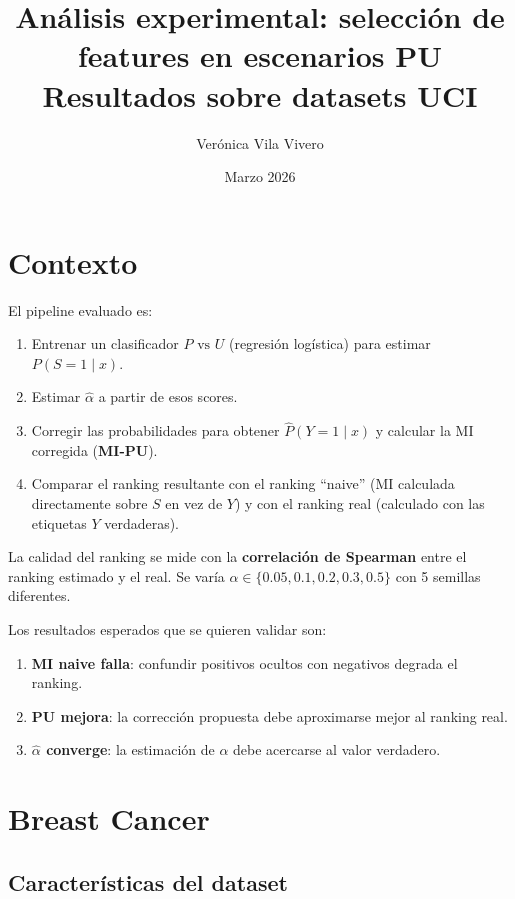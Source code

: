 \documentclass[a4paper,11pt]{article}
\title{\textbf{Análisis experimental: selección de features en escenarios PU}\\
\large Resultados sobre datasets UCI}
\author{Verónica Vila Vivero}
\date{Marzo 2026}
\begin{document}
\maketitle
\tableofcontents
\newpage

\section{Contexto}

El pipeline evaluado es:
\begin{enumerate}
    \item Entrenar un clasificador $P \text{ vs } U$ (regresión logística) para estimar $P(S=1 \mid x)$.
    \item Estimar $\hat{\alpha}$ a partir de esos scores.
    \item Corregir las probabilidades para obtener $\hat{P}(Y=1 \mid x)$ y calcular la MI corregida (\textbf{MI-PU}).
    \item Comparar el ranking resultante con el ranking ``naive'' (MI calculada directamente sobre $S$ en vez de $Y$) y con el ranking real (calculado con las etiquetas $Y$ verdaderas).
\end{enumerate}

La calidad del ranking se mide con la \textbf{correlación de Spearman} entre el ranking estimado y el real. Se varía $\alpha \in \{0.05, 0.1, 0.2, 0.3, 0.5\}$ con 5 semillas diferentes.

\medskip
Los resultados esperados que se quieren validar son:
\begin{enumerate}
    \item[\textbf{H1}] \textbf{MI naive falla}: confundir positivos ocultos con negativos degrada el ranking.
    \item[\textbf{H2}] \textbf{PU mejora}: la corrección propuesta debe aproximarse mejor al ranking real.
    \item[\textbf{H3}] \textbf{$\hat{\alpha}$ converge}: la estimación de $\alpha$ debe acercarse al valor verdadero.
\end{enumerate}

\section{Breast Cancer}

\subsection{Características del dataset}
\end{document}
